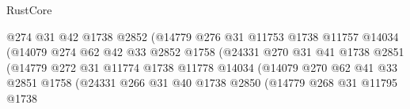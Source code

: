 \begin{lexlean}{RustCore}
\begin{coremodule}
                                        @274
                                        @31
                                        @42
                                        @1738
                                        @2852
                                        (@14779
                                          @276
                                          @31
                                          @11753
                                          @1738
                                          @11757
                                          @14034
                                          (@14079
                                            @274
                                            @62
                                            @42
                                            @33
                                            @2852
                                            @1758
                                            (@24331
                                              @270
                                              @31
                                              @41
                                              @1738
                                              @2851
                                              (@14779
                                                @272
                                                @31
                                                @11774
                                                @1738
                                                @11778
                                                @14034
                                                (@14079
                                                  @270
                                                  @62
                                                  @41
                                                  @33
                                                  @2851
                                                  @1758
                                                  (@24331
                                                    @266
                                                    @31
                                                    @40
                                                    @1738
                                                    @2850
                                                    (@14779
                                                      @268
                                                      @31
                                                      @11795
                                                      @1738

\end{coremodule}
\end{lexlean}
